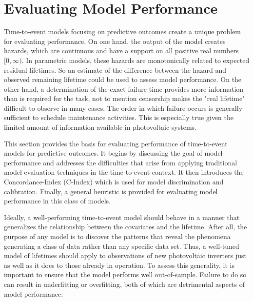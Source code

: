 


\section*{Evaluating Model Performance}

Time-to-event models focusing on predictive outcomes create a unique problem for evaluating performance. On one hand, the output of the model creates hazards, which are continuous and have a support on all positive real numbers $[0, \infty)$. In parametric models, these hazards are monotonically related to expected residual lifetimes. So an estimate of the difference between the hazard and observed remaining lifetime could be used to assess model performance. On the other hand, a determination of the exact failure time provides more information than is required for the task, not to mention censorship makes the "real lifetime" difficult to observe in many cases. The order in which failure occurs is generally sufficient to schedule maintenance activities. This is especially true given the limited amount of information available in photovoltaic systems. 

This section provides the basis for evaluating performance of time-to-event models for predictive outcomes. It begins by discussing the goal of model performance and addresses the difficulties that arise from applying traditional model evaluation techniques in the time-to-event context. It then introduces the Concordance-Index (C-Index) which is used for model discrimination and calibration. Finally, a general heuristic is provided for evaluating model performance in this class of models.

Ideally, a well-performing time-to-event model should behave in a manner that generalizes the relationship between the covariates and the lifetime. After all, the purpose of any model is to discover the patterns that reveal the phenomena generating a class of data rather than any specific data set. Thus, a well-tuned model of lifetimes should apply to observations of new photovoltaic inverters just as well as it does to those already in operation. To assess this generality, it is important to ensure that the model performs well out-of-sample. Failure to do so can result in underfitting or overfitting, both of which are detrimental aspects of model performance. 


